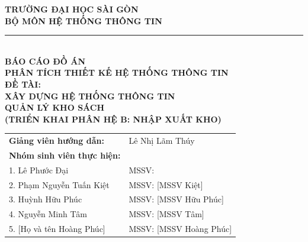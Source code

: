 \documentclass[12pt,a4paper]{article}
\begin{document}
\begin{titlepage}

    \begin{center}
        \vspace*{0.2cm}
        {\large \textbf{TRƯỜNG ĐẠI HỌC SÀI GÒN}}\\[0.2cm]
       
        \textbf{BỘ MÔN HỆ THỐNG THÔNG TIN}\\[0.5cm]
        
        \rule{0.5\textwidth}{1pt}\\[1.5cm]

        {\large \textbf{BÁO CÁO ĐỒ ÁN}}\\[0.3cm]
        {\large \textbf{PHÂN TÍCH THIẾT KẾ HỆ THỐNG THÔNG TIN}}\\[1.2cm]

        {\Large \textbf{ĐỀ TÀI:}}\\[0.4cm]
        {\LARGE \textbf{XÂY DỰNG HỆ THỐNG THÔNG TIN}}\\[0.3cm]
        {\LARGE \textbf{QUẢN LÝ KHO SÁCH}}\\[0.4cm]
        {\large \textbf{(TRIỂN KHAI PHÂN HỆ B: NHẬP XUẤT KHO)}}\\[2.0cm]
    \end{center}

    \vfill

    \begin{flushleft}
        \hspace*{1.0cm}
        \begin{tabular}{ll}
            \textbf{Giảng viên hướng dẫn:} & Lê Nhị Lãm Thúy \\[0.4cm]
            \textbf{Nhóm sinh viên thực hiện:}  \\[0.2cm]
            1. Lê Phước Đại & MSSV:  \\
            2. Phạm Nguyễn Tuấn Kiệt & MSSV: [MSSV Kiệt] \\
            3. Huỳnh Hữu Phúc & MSSV: [MSSV Hữu Phúc] \\
            4. Nguyễn Minh Tâm & MSSV: [MSSV Tâm] \\
            5. [Họ và tên Hoàng Phúc] & MSSV: [MSSV Hoàng Phúc] \\
        \end{tabular}
    \end{flushleft}


\end{titlepage}
\end{document}
